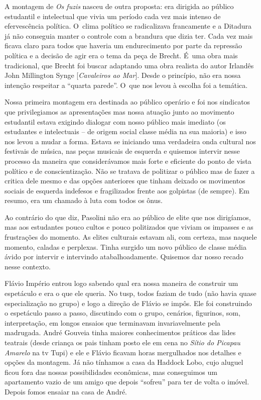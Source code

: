 \subject{Montagem dos fuzis de Tereza Carrar}

A montagem de {\it Os fuzis} nasceu de outra proposta: era dirigida ao
público estudantil e intelectual que vivia um período cada vez mais
intenso de efervescência política. O~clima político se radicalizava
francamente e a Ditadura já não conseguia manter o controle com a
brandura que dizia ter. Cada vez mais ficava claro para todos que
haveria um endurecimento por parte da repressão política e a decisão de
agir era o tema da peça de Brecht. É~uma obra mais tradicional, que
Brecht foi buscar adaptando uma obra realista do autor Irlandês John
Millington Synge {[}{\it Cavaleiros ao Mar}{]}. Desde o princípio, não
era nossa intenção respeitar a “quarta parede”. O~que nos levou à
escolha foi a temática.

Nossa primeira montagem era destinada ao público operário e foi nos
sindicatos que privilegiamos as apresentações mas nossa atuação junto ao
movimento estudantil estava exigindo dialogar com nosso público mais
imediato (os estudantes e intelectuais -- de origem social classe média
na sua maioria) e isso nos levou a mudar a forma. Estava se iniciando
uma verdadeira onda cultural nos festivais de música, nas peças musicais
de esquerda e quisemos intervir nesse processo da maneira que
considerávamos mais forte e eficiente do ponto de vista político e de
conscientização. Não se tratava de politizar o público mas de fazer a
critica dele mesmo e das opções anteriores que tinham deixado os
movimentos sociais de esquerda indefesos e fragilizados frente aos
golpistas (de sempre). Em resumo, era um chamado à luta com todos os
ônus.

Ao contrário do que diz, Pasolini não era ao público de elite que nos
dirigíamos, mas aos estudantes pouco cultos e pouco politizados que
viviam os impasses e as frustrações do momento. As elites culturais
estavam ali, com certeza, mas naquele momento, caladas e perplexas.
Tinha surgido um novo público de classe média ávido por intervir e
intervindo atabalhoadamente. Quisemos dar nosso recado nesse contexto.

Flávio Império entrou logo sabendo qual era nossa maneira de construir
um espetáculo e era o que ele queria. No {\sc tusp}, todos faziam de tudo (não
havia quase especialização no grupo) e logo a direção de Flávio se
impôs. Ele foi construindo o espetáculo passo a passo, discutindo com o
grupo, cenários, figurinos, som, interpretação, em longos ensaios que
terminavam invariavelmente pela madrugada. André Gouveia tinha maiores
conhecimentos práticos das lides teatrais (desde criança os pais tinham
posto ele em cena no {\it Sítio do Picapau Amarelo} na {\sc tv} Tupi) e ele e
Flávio ficavam horas mergulhados nos detalhes e opções da montagem. Já
não tínhamos a casa da Haddock Lobo, cujo aluguel ficou fora das nossas
possibilidades econômicas, mas conseguimos um apartamento vazio de um
amigo que depois “sofreu” para ter de volta o imóvel. Depois fomos
ensaiar na casa de André.

